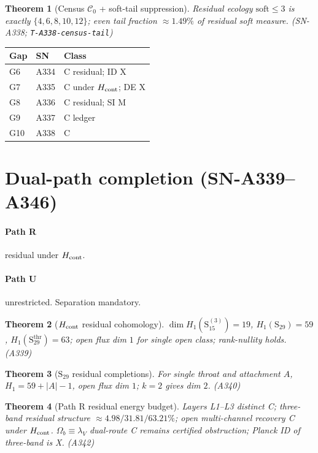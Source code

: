 \documentclass[11pt,a4paper]{article}
\newtheorem{theorem}{Theorem}
\theoremstyle{remark}
\begin{document}
\begin{theorem}[Census $\mathcal{C}_0$ + soft-tail suppression]
Residual ecology $\mathrm{soft}\le 3$ is exactly $\{4,6,8,10,12\}$; even tail fraction $\approx 1.49\%$ of residual soft measure. (SN-A338; \texttt{T-A338-census-tail})
\end{theorem}

\begin{center}
\begin{tabular}{@{}llp{5.5cm}@{}}
\toprule
Gap & SN & Class \\
\midrule
G6 & A334 & C residual; ID X \\
G7 & A335 & C under $H_{\rm cont}$; DE X \\
G8 & A336 & C residual; SI M \\
G9 & A337 & C ledger \\
G10 & A338 & C \\
\bottomrule
\end{tabular}
\end{center}


\section{Dual-path completion (SN-A339--A346)}
\label{sec:dual-path-A339}

\paragraph{Path R} residual under $H_{\rm cont}$. \paragraph{Path U} unrestricted. Separation mandatory.

\begin{theorem}[$H_{\rm cont}$ residual cohomology]
$\dim H_1(\mathrm{S}_{15}^{(3)})=19$, $H_1(\mathrm{S}_{29})=59$, $H_1(\mathrm{S}_{29}^{\mathrm{thr}})=63$; open flux dim $1$ for single open class; rank-nullity holds. (A339)
\end{theorem}

\begin{theorem}[$\mathrm{S}_{29}$ residual completions]
For single throat and attachment $A$, $H_1=59+|A|-1$, open flux dim $1$; $k=2$ gives dim $2$. (A340)
\end{theorem}

\begin{theorem}[Path R residual energy budget]
Layers L1--L3 distinct C; three-band residual structure $\approx 4.98/31.81/63.21\%$; open multi-channel recovery C under $H_{\rm cont}$. $\Omega_b\equiv\lambda_V$ dual-route C remains certified obstruction; Planck ID of three-band is X. (A342)
\end{theorem}
\end{document}

